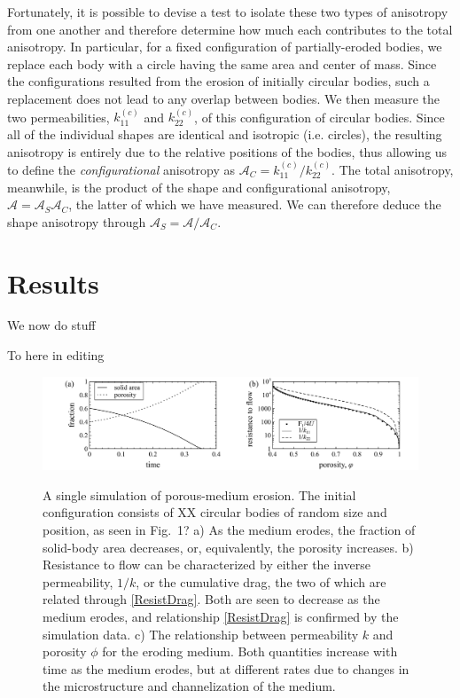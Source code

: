 \documentclass[3p]{elsarticle}
\newcommand{\vsp}[1]{\vspace{#1 pc} \noindent}
\newcommand{\nick}[1]{ {\color{red} #1} }
\newcommand{\anis}{\mathcal{A}}
\begin{document}
	Fortunately, it is possible to devise a test to isolate these two types of anisotropy from one another and therefore determine how much each contributes to the total anisotropy. In particular, for a fixed configuration of partially-eroded bodies, we replace each body with a circle having the same area and center of mass. Since the configurations resulted from the erosion of initially circular bodies, such a replacement does not lead to any overlap between bodies. We then measure the two permeabilities, $k_{11}^{(c)}$ and $ k_{22}^{(c)}$, of this configuration of circular bodies. Since all of the individual shapes are identical and isotropic (i.e. circles), the resulting anisotropy is entirely due to the relative positions of the bodies, thus allowing us to define the {\em configurational} anisotropy as $\anis_C = k_{11}^{(c)} / k_{22}^{(c)}$. The total anisotropy, meanwhile, is the product of the shape and configurational anisotropy, $\anis = \anis_S \anis_C$, the latter of which we have measured. We can therefore deduce the shape anisotropy through $\anis_S = \anis/\anis_C$.

\section{Results}

We now do stuff

\vsp{2} \nick{To here in editing} \vsp{2}



\begin{figure}%
\centering \label{fig2}
\includegraphics[width = 0.99 \textwidth]{./figs/fig2.pdf}
\caption{A single simulation of porous-medium erosion. The initial configuration consists of XX circular bodies of random size and position, as seen in Fig.~1? a) As the medium erodes, the fraction of solid-body area decreases, or, equivalently, the porosity increases. b) Resistance to flow can be characterized by either the inverse permeability, $1/k$, or the cumulative drag, the two of which are related through \eqref{ResistDrag}. Both are seen to decrease as the medium erodes, and relationship \eqref{ResistDrag} is confirmed by the simulation data.
c) The relationship between permeability $k$ and porosity $\phi$ for the eroding medium. Both quantities increase with time as the medium erodes, but at different rates due to changes in the microstructure and channelization of the medium.
}
\end{figure}
\end{document}
